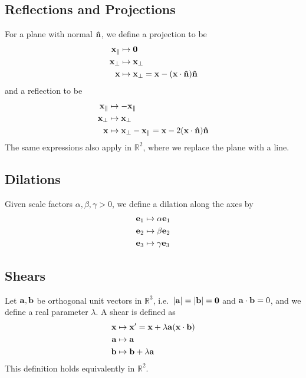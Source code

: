 \subsection{Reflections and Projections}
For a plane with normal \(\vu{n}\), we define a projection to be
\begin{align*}
	\vb x_\parallel & \mapsto \vb 0                                           \\
	\vb x_\perp     & \mapsto \vb x_\perp                                     \\
	\vb x           & \mapsto \vb x_\perp = \vb x - (\vb x \cdot \vu{n}) \vu{n}
\end{align*}
and a reflection to be
\begin{align*}
	\vb x_\parallel & \mapsto -\vb x_\parallel                                                   \\
	\vb x_\perp     & \mapsto \vb x_\perp                                                        \\
	\vb x           & \mapsto \vb x_\perp - \vb x_\parallel = \vb x - 2(\vb x \cdot \vu{n}) \vu{n}
\end{align*}
The same expressions also apply in \(\mathbb R^2\), where we replace the plane with a line.

\subsection{Dilations}
Given scale factors \(\alpha, \beta, \gamma > 0\), we define a dilation along the axes by
\begin{align*}
	\vb e_1 & \mapsto \alpha \vb e_1 \\
	\vb e_2 & \mapsto \beta \vb e_2  \\
	\vb e_3 & \mapsto \gamma \vb e_3
\end{align*}

\subsection{Shears}
Let \(\vb a, \vb b\) be orthogonal unit vectors in \(\mathbb R^3\), i.e.\ \(\abs{\vb a} = \abs{\vb b} = \vb 0\) and \(\vb a \cdot \vb b = 0\), and we define a real parameter \(\lambda\).
A shear is defined as
\begin{align*}
	\vb x & \mapsto \vb x' = \vb x + \lambda \vb a (\vb x \cdot \vb b) \\
	\vb a & \mapsto \vb a                                              \\
	\vb b & \mapsto \vb b + \lambda \vb a
\end{align*}
This definition holds equivalently in \(\mathbb R^2\).

